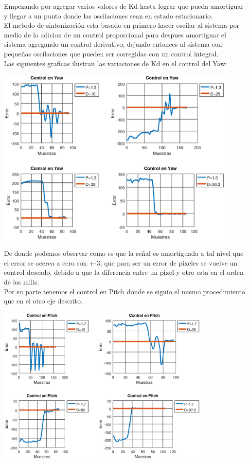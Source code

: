 Empezando por agregar varios valores de Kd hasta lograr que pueda amortiguar y llegar a un punto donde las oscilaciones sean en estado
estacionario.\\
El metodo de sintonización esta basado en primero hacer oscilar al sistema por medio de la adicion de un control proporcional para despues
amortiguar el sistema agregando un control derivativo, dejando entonces al sistema con pequeñas oscilaciones que pueden ser corregidas con un
control integral. \\
Las siguientes graficas ilustran las variaciones de Kd en el control del Yaw:
\begin{center}
	\includegraphics[width=0.9\textwidth]{Contenido/Cuerpo/Capitulo5/Fig10.eps}
	\label{Fig4}
\end{center}
De donde podemos observar como es que la señal es amortiguada a tal nivel que el error se acerca a cero con +-3, que para ser
un error de pixeles se vuelve un control deseado, debido a que la diferencia entre un pixel y otro esta en el orden de los milis.\\
Por su parte tenemos el control en Pitch donde se siguio el mismo procedimiento que en el otro eje descrito.
\begin{center}
	\includegraphics[width=0.8\textwidth]{Contenido/Cuerpo/Capitulo5/Fig11.eps}
	\label{Fig4}
\end{center}

